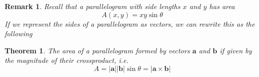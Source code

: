 \documentclass[12pt]{exam}
\newcommand{\ba}{\bm{a}}
\newcommand{\bb}{\bm{b}}
\newcommand{\bc}{\bm{c}}
\newcommand{\gen}[1]{\left\langle #1 \right\rangle}
\newtheorem*{remark}{Remark}
\newtheorem*{theorem}{Theorem}
\begin{document}
\begin{questions}

\ifprintanswers

    \newpage
\fi




\begin{remark}
    Recall that a parallelogram with side lengths \(x\) and \(y\) has area
        \[
            A(x,y) = xy\sin\theta
        \]
    If we represent the sides of a parallelogram as vectors, we can rewrite this as the following
\end{remark}

\begin{theorem}
        The area of a parallelogram formed by vectors \(\ba\) and \(\bb\) if given by
        the magnitude of their crossproduct, i.e.
        \[
            A = |\ba||\bb|\sin\theta = |\ba\times\bb|
        \]

\begin{center}
\end{center}
\end{theorem}


\end{questions}
\end{document}
